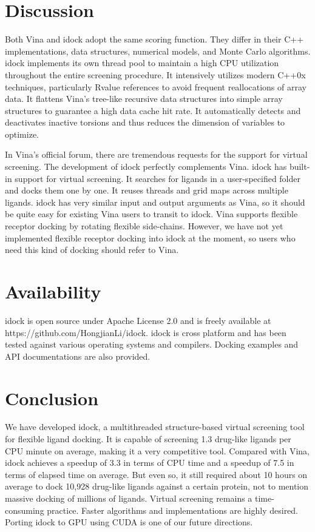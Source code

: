 \documentclass[10pt, conference, compsocconf]{IEEEtran}
\begin{document}
\section{Discussion}

Both Vina and idock adopt the same scoring function. They differ in their C++ implementations, data structures, numerical models, and Monte Carlo algorithms. idock implements its own thread pool to maintain a high CPU utilization throughout the entire screening procedure. It intensively utilizes modern C++0x techniques, particularly Rvalue references to avoid frequent reallocations of array data. It flattens Vina's tree-like recursive data structures into simple array structures to guarantee a high data cache hit rate. It automatically detects and deactivates inactive torsions and thus reduces the dimension of variables to optimize.

In Vina's official forum, there are tremendous requests for the support for virtual screening. The development of idock perfectly complements Vina. idock has built-in support for virtual screening. It searches for ligands in a user-specified folder and docks them one by one. It reuses threads and grid maps across multiple ligands. idock has very similar input and output arguments as Vina, so it should be quite easy for existing Vina users to transit to idock. Vina supports flexible receptor docking by rotating flexible side-chains. However, we have not yet implemented flexible receptor docking into idock at the moment, so users who need this kind of docking should refer to Vina.

\section{Availability}

idock is open source under Apache License 2.0 and is freely available at https://github.com/HongjianLi/idock. idock is cross platform and has been tested against various operating systems and compilers. Docking examples and API documentations are also provided.

\section{Conclusion}

We have developed idock, a multithreaded structure-based virtual screening tool for flexible ligand docking. It is capable of screening 1.3 drug-like ligands per CPU minute on average, making it a very competitive tool. Compared with Vina, idock achieves a speedup of 3.3 in terms of CPU time and a speedup of 7.5 in terms of elapsed time on average. But even so, it still required about 10 hours on average to dock 10,928 drug-like ligands against a certain protein, not to mention massive docking of millions of ligands. Virtual screening remains a time-consuming practice. Faster algorithms and implementations are highly desired. Porting idock to GPU using CUDA is one of our future directions.



\end{document}
